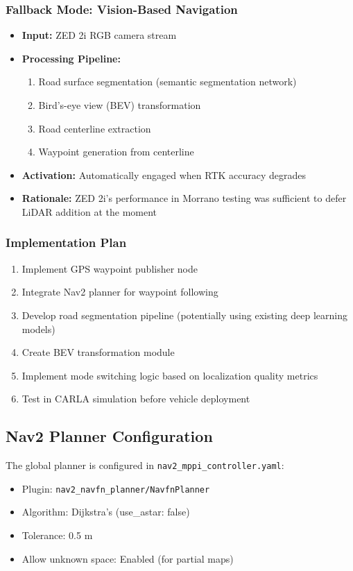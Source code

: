 \subsubsection{Fallback Mode: Vision-Based Navigation}
\begin{itemize}
    \item \textbf{Input:} ZED 2i RGB camera stream
    \item \textbf{Processing Pipeline:}
    \begin{enumerate}
        \item Road surface segmentation (semantic segmentation network)
        \item Bird's-eye view (BEV) transformation
        \item Road centerline extraction
        \item Waypoint generation from centerline
    \end{enumerate}
    \item \textbf{Activation:} Automatically engaged when RTK accuracy degrades
    \item \textbf{Rationale:} ZED 2i's performance in Morrano testing was sufficient to defer LiDAR addition at the moment
\end{itemize}

\subsubsection{Implementation Plan}
\begin{enumerate}
    \item Implement GPS waypoint publisher node
    \item Integrate Nav2 planner for waypoint following
    \item Develop road segmentation pipeline (potentially using existing deep learning models)
    \item Create BEV transformation module
    \item Implement mode switching logic based on localization quality metrics
    \item Test in CARLA simulation before vehicle deployment
\end{enumerate}

\subsection{Nav2 Planner Configuration}
The global planner is configured in \texttt{nav2\_mppi\_controller.yaml}:
\begin{itemize}
    \item Plugin: \texttt{nav2\_navfn\_planner/NavfnPlanner}
    \item Algorithm: Dijkstra's (use\_astar: false)
    \item Tolerance: 0.5 m
    \item Allow unknown space: Enabled (for partial maps)
\end{itemize}

